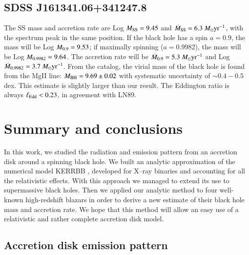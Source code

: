 \documentclass{aa}
\begin{document}
\subsection{SDSS J161341.06+341247.8}
The SS mass and accretion rate are Log $M_{\rm SS} = 9.45$ and $\dot{M}_{\rm SS} = 6.3\ M_{\odot} \text{yr}^{-1}$, with the spectrum peak in the same position. If the black hole has a spin $a = 0.9$, the mass will be Log $M_{\rm 0.9} = 9.53$; if maximally spinning ($a = 0.9982$), the mass will be Log $M_{\rm 0.9982} = 9.64$. The accretion rate will be $\dot{M}_{\rm 0.9} = 5.3\ M_{\odot} \text{yr}^{-1}$ and Log $\dot{M}_{\rm 0.9982} = 3.7\ M_{\odot} \text{yr}^{-1}$. From the \citet{Shenetal11} catalog, the virial mass of the black hole is found from the MgII line: $M_{\rm BH} = 9.69 \pm 0.02$  with systematic uncertainty of $\sim 0.4-0.5$ dex. This estimate is slightly larger than our result. The Eddington ratio is always $\ell_{\rm Edd} < 0.23$, in agreement with LN89.








\section{Summary and conclusions} \label{sec-concl}

In this work, we studied the radiation and emission pattern from an accretion disk around a spinning black hole. We built an analytic approximation of the numerical model KERRBB \citep{Lietal}, developed for X--ray binaries and accounting for all the relativistic effects. With this approach we managed to extend its use to supermassive black holes. Then we applied our analytic method to four well-known high-redshift blazars in order to derive a new estimate of their black hole mass and accretion rate.
We hope that this method will allow an easy use of a relativistic and rather complete accretion disk model. 


\subsection{Accretion disk emission pattern}
\end{document}
